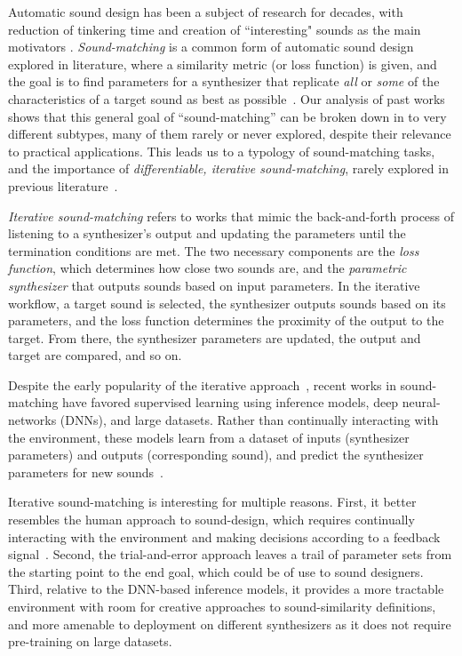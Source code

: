 \documentclass[lettersize,journal]{IEEEtran}
\providecommand{\gls}[1]{#1}
\begin{document}
Automatic sound design has been a subject of research for decades, with reduction of tinkering time and creation of ``interesting" sounds as the main motivators \cite{krekovic2019insights,turian2020sorry,horner1993machine,salimi2020make,esling2019flow,engel2020ddsp,mitchell2007evolutionary,shier2020spiegelib,masuda2021soundmatch,masuda2023improving}. \textit{Sound-matching} is a common form of automatic sound design explored in literature, where a similarity metric (or loss function) is given, and the goal is to find parameters for a synthesizer that replicate \textit{all} or \textit{some} of the characteristics of a target sound as best as possible~\cite{horner1993machine,mitchell2007evolutionary,masuda2023improving}. Our analysis of past works shows that this general goal of ``sound-matching'' can be broken down in to very different subtypes, many of them rarely or never explored, despite their relevance to practical applications. This leads us to a typology of sound-matching tasks, and the importance of \textit{differentiable, iterative sound-matching}, rarely explored in previous literature~\cite{vahidi2023mesostructures}.

\textit{Iterative sound-matching} refers to works that mimic the back-and-forth process of listening to a synthesizer's output and updating the parameters until the termination conditions are met. The two necessary components are the \textit{loss function}, which determines how close two sounds are, and the \textit{parametric synthesizer} that outputs sounds based on input parameters. In the iterative workflow, a target sound is selected, the synthesizer outputs sounds based on its parameters, and the loss function determines the proximity of the output to the target. From there, the synthesizer parameters are updated, the output and target are compared, and so on. 

Despite the early popularity of the iterative approach~\cite{justice1979analytic,horner1993machine,mitchell2007evolutionary}, recent works in sound-matching have favored supervised learning using inference models, deep neural-networks (\gls{DNNs}), and large datasets. Rather than continually interacting with the environment, these models learn from a dataset of inputs (synthesizer parameters) and outputs (corresponding sound), and predict the synthesizer parameters for new sounds~\cite{yee2018automatic,han2023perceptual,han2024learning,masuda2021soundmatch,masuda2023improving}. 

Iterative sound-matching is interesting for multiple reasons. First, it better resembles the human approach to sound-design, which requires continually interacting with the environment and making decisions according to a feedback signal~\cite{sutton2018reinforcement}. Second, the trial-and-error approach leaves a trail of parameter sets from the starting point to the end goal, which could be of use to sound designers. Third, relative to the DNN-based inference models, it provides a more tractable environment with room for creative approaches to sound-similarity definitions, and more amenable to deployment on different synthesizers as it does not require pre-training on large datasets. 
\end{document}

